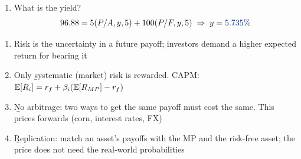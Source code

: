 \begin{example}
\begin{enumerate}[label = \alph*)]
\begin{align*}
            P_{up}^{(2)} &= 5 + \frac{0.95(103.60) + 0.05(50)}{1.03} = 102.98\\
            P_{up}^{(1)} &= 5 + \frac{0.95(102.98) + 0.05(50)}{1.03} = 102.41\\
            P_0 &= \frac{0.95(102.41) + 0.05(50)}{1.03} = \db{\$96.88}
        \end{align*}
        \item What is the yield?
        \[96.88 = 5(P/A,y,5) + 100(P/F,y,5) \;\Rightarrow\; y = \db{5.735\%}\]
    \end{enumerate}
\end{example}

\begin{enumerate}
    \item Risk is the uncertainty in a future payoff; investors demand a higher expected return for bearing it
    \item Only \b{systematic} (market) risk is rewarded. CAPM: $\mathbb{E}[R_i] = r_f + \beta_i(\mathbb{E}[R_{MP}] - r_f)$
    \item \b{No arbitrage}: two ways to get the same payoff must cost the same. This prices forwards (corn, interest rates, FX)
    \item \b{Replication}: match an asset's payoffs with the MP and the risk-free asset; the price does not need the real-world probabilities
\end{enumerate}
